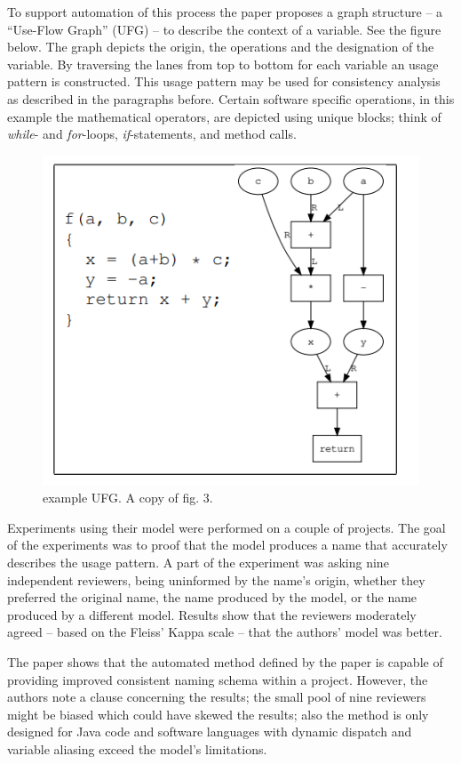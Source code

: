 \documentclass[a4paper,12pt]{article}
\begin{document}
\begin{multicols}{2}
To support automation of this process the paper proposes a graph structure -- a “Use-Flow Graph” (UFG) -- to describe the context of a variable. See the figure below. The graph depicts the origin, the operations and the designation of the variable. By traversing the lanes from top to bottom for each variable an usage pattern is constructed. This usage pattern  may be used for consistency analysis as described in the paragraphs before. Certain software specific operations, in this example the mathematical operators, are depicted using unique blocks; think of \textit{while}- and \textit{for}-loops, \textit{if}-statements, and method calls. 

\begin{figure}[ht]
    \centering
    \includegraphics[width=0.7\linewidth]{ufg}
    \caption{example UFG. A copy of fig. 3.\cite{shinyama_improving_2021}}
    \label{fig:ufg}
\end{figure}
\hfill
\FloatBarrier

Experiments using their model were performed on a couple of projects. The goal of the experiments was to proof that the model produces a name that accurately describes the usage pattern. A part of the experiment was asking nine independent reviewers, being uninformed by the name's origin, whether they preferred the original name, the name produced by the model, or the name produced by a different model. Results show that the reviewers moderately agreed -- based on the Fleiss' Kappa scale -- that the authors' model was better.
    
The paper shows that the automated method defined by the paper is capable of providing improved consistent naming schema within a project. However, the authors note a clause concerning the results; the small pool of nine reviewers might be biased which could have skewed the results; also the method is only designed for Java code and software languages with dynamic dispatch and variable aliasing exceed the model's limitations.


\end{multicols}
\end{document}
